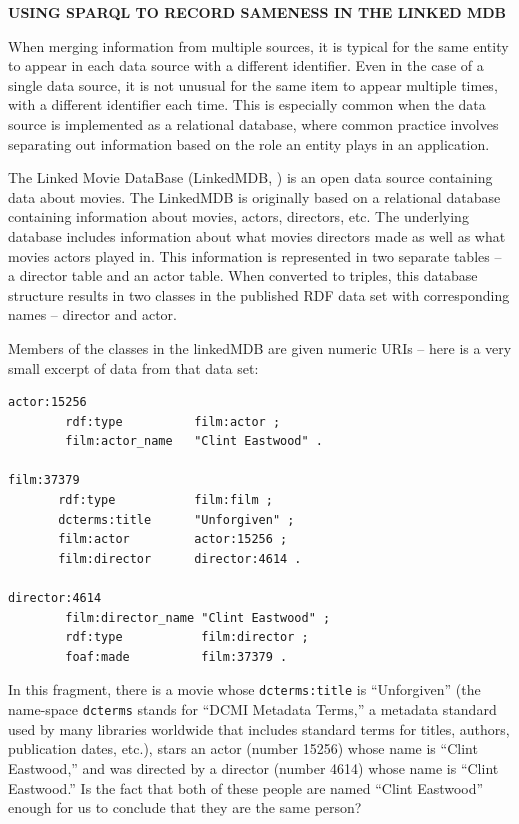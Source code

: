 \begin{challenge} 
\textbf{USING SPARQL TO RECORD SAMENESS IN THE LINKED MDB}
\label{chal:3}

When merging information from multiple sources, it is typical for the
same entity to appear in each data source with a different identifier.
Even in the case of a single data source, it is not unusual for the same
item to appear multiple times, with a different identifier each time.
This is especially common when the data source is implemented as a
relational database, where common practice involves separating out
information based on the role an entity plays in an application.

The Linked Movie DataBase (LinkedMDB, \cite{ldow09/HassanzadehC}) is an 
open data source containing
data about movies. The LinkedMDB is originally based on a relational database
containing information about movies, actors, directors, etc. The
underlying database includes information about what movies directors
made as well as what movies actors played in. This information is
represented in two separate tables -- a director table and an actor
table. When converted to triples, this database structure results in two
classes in the published RDF data set with corresponding names --
director and actor.

Members of the classes in the linkedMDB are given numeric URIs -- here
is a very small excerpt of data from that data set:

\begin{lstlisting}
actor:15256 
        rdf:type          film:actor ;
        film:actor_name   "Clint Eastwood" .

film:37379
       rdf:type           film:film ;
       dcterms:title      "Unforgiven" ;
       film:actor         actor:15256 ;
       film:director      director:4614 .

director:4614  
        film:director_name "Clint Eastwood" ;
        rdf:type           film:director ;
        foaf:made          film:37379 .

\end{lstlisting}

In this fragment, there is a movie whose \texttt{dcterms:title} is ``Unforgiven'' (the
name-space \texttt{dcterms} stands for ``DCMI Metadata Terms,'' a metadata standard used by
many libraries worldwide that includes standard terms for titles,
authors, publication dates, etc.), stars an actor (number 15256) whose
name is ``Clint Eastwood,'' and was directed by a director (number 4614)
whose name is ``Clint Eastwood.'' Is the fact that both of these people
are named ``Clint Eastwood'' enough for us to conclude that they are the
same person?


\end{challenge}

